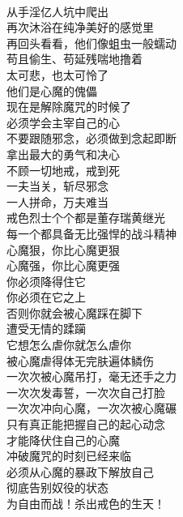 \begin{poem}[冲破手淫的魔咒]
    \begin{multicols}{2}
        \begin{center}~\\
            从手淫亿人坑中爬出 \\ 再次沐浴在纯净美好的感觉里 \\ 再回头看看，他们像蛆虫一般蠕动 \\ 苟且偷生、苟延残喘地撸着 \\ 太可悲，也太可怜了 \\ 他们是心魔的傀儡 \\ 现在是解除魔咒的时候了 \\ 必须学会主宰自己的心 \\ 不要跟随邪念，必须做到念起即断 \\ 拿出最大的勇气和决心 \\ 不顾一切地戒，戒到死 \\ 一夫当关，斩尽邪念 \\ 一人拼命，万夫难当 \\ 戒色烈士个个都是董存瑞黄继光 \\ 每一个都具备无比强悍的战斗精神 \\ 心魔狠，你比心魔更狠 \\ 心魔强，你比心魔更强 \\ 你必须降得住它 \\ 你必须在它之上 \\ 否则你就会被心魔踩在脚下 \\ 遭受无情的蹂躏 \\ 它想怎么虐你就怎么虐你 \\ 被心魔虐得体无完肤遍体鳞伤 \\ 一次次被心魔吊打，毫无还手之力 \\ 一次次发毒誓，一次次自己打脸 \\ 一次次冲向心魔，一次次被心魔碾 \\ 只有真正能把握自己的起心动念 \\ 才能降伏住自己的心魔 \\ 冲破魔咒的时刻已经来临 \\ 必须从心魔的暴政下解放自己 \\ 彻底告别奴役的状态 \\ 为自由而战！杀出戒色的生天！
        \end{center}
    \end{multicols}
\end{poem}

